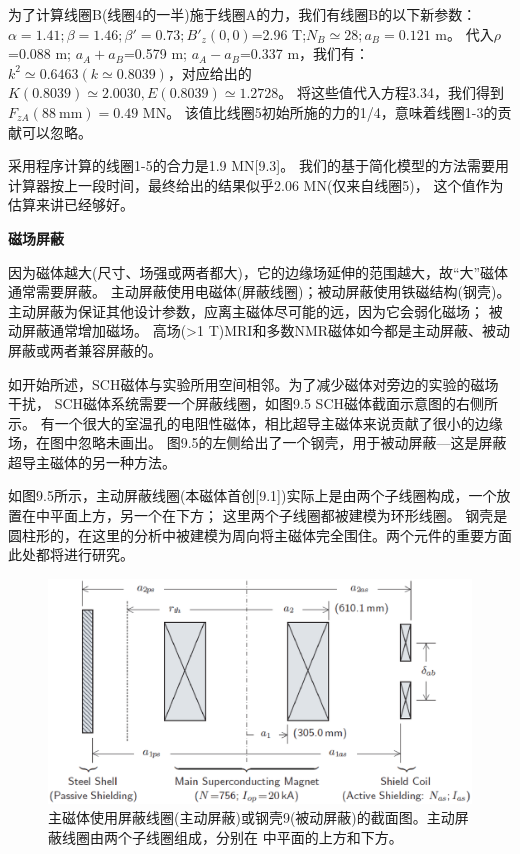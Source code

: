 为了计算线圈B(线圈4的一半)施于线圈A的力，我们有线圈B的以下新参数：
$\alpha=1.41;\beta=1.46;\beta'=0.73;B'_z(0,0)$=2.96 T;$N_B\simeq 28; a_B=0.121$ m。
代入$\rho$=0.088 m; $a_A+a_B$=0.579 m; $a_A-a_B$=0.337 m，我们有：
$k^2\simeq 0.6463(k\simeq 0.8039)$，对应给出的$K(0.8039)\simeq 2.0030, E(0.8039)\simeq 1.2728$。
将这些值代入方程3.34，我们得到$F_{zA}(88\ \mathrm{mm})=0.49$ MN。
该值比线圈5初始所施的力的1/4，意味着线圈1-3的贡献可以忽略。

采用程序计算的线圈1-5的合力是1.9 MN[9.3]。
我们的基于简化模型的方法需要用计算器按上一段时间，最终给出的结果似乎2.06 MN(仅来自线圈5)，
这个值作为估算来讲已经够好。

\textbf{磁场屏蔽}

因为磁体越大(尺寸、场强或两者都大)，它的边缘场延伸的范围越大，故“大”磁体通常需要屏蔽。
主动屏蔽使用电磁体(屏蔽线圈)；被动屏蔽使用铁磁结构(钢壳)。
主动屏蔽为保证其他设计参数，应离主磁体尽可能的远，因为它会弱化磁场；
被动屏蔽通常增加磁场。
高场(>1 T)MRI和多数NMR磁体如今都是主动屏蔽、被动屏蔽或两者兼容屏蔽的。

如开始所述，SCH磁体与实验所用空间相邻。为了减少磁体对旁边的实验的磁场干扰，
SCH磁体系统需要一个屏蔽线圈，如图9.5 SCH磁体截面示意图的右侧所示。
有一个很大的室温孔的电阻性磁体，相比超导主磁体来说贡献了很小的边缘场，在图中忽略未画出。
图9.5的左侧给出了一个钢壳，用于被动屏蔽---这是屏蔽超导主磁体的另一种方法。

如图9.5所示，主动屏蔽线圈(本磁体首创[9.1])实际上是由两个子线圈构成，一个放置在中平面上方，另一个在下方；
这里两个子线圈都被建模为环形线圈。
钢壳是圆柱形的，在这里的分析中被建模为周向将主磁体完全围住。两个元件的重要方面此处都将进行研究。

\begin{figure}[htbp]
	\centering
	\includegraphics[scale=0.6]{chpt9/figs/fig9.5.eps}
	\caption{主磁体使用屏蔽线圈(主动屏蔽)或钢壳9(被动屏蔽)的截面图。主动屏蔽线圈由两个子线圈组成，分别在
		中平面的上方和下方。}
\end{figure}

